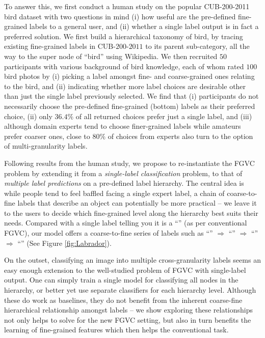 \documentclass[final]{cvpr}
\begin{document}
To answer this, we first conduct a human study on the popular CUB-200-2011 bird dataset \cite{wah2011caltech} with two questions in mind (i) how useful are the pre-defined fine-grained labels to a general user, and (ii) whether a single label output is in fact a preferred solution. We first build a hierarchical taxonomy of bird, by tracing existing fine-grained labels in CUB-$200$-$2011$ to its parent sub-category, all the way to the super node of ``bird'' using Wikipedia.  We then recruited $50$ participants with various background of bird knowledge, each of whom rated $100$ bird photos by (i) picking a label amongst fine- and coarse-grained ones relating to the bird, and (ii) indicating whether more label choices are desirable other than just the single label previously selected. We find that (i) participants do not necessarily choose the pre-defined fine-grained (bottom) labels as their preferred choice, (ii) only $36.4\%$ of all returned choices prefer just a single label, and (iii) although domain experts tend to choose finer-grained labels while amateurs prefer coarser ones, close to $80\%$ of choices from experts also turn to the option of multi-granularity labels.

Following results from the human study, we propose to re-instantiate the FGVC problem by extending it from a \textit{single-label classification} problem, to that of \textit{multiple label predictions} on a pre-defined label hierarchy. The central idea is while people tend to feel baffled facing a single expert label, a chain of coarse-to-fine labels that describe an object can potentially be more practical -- we leave it to the users to decide which fine-grained level along the hierarchy best suits their needs. Compared with a single label telling you it is a ``'' (as per conventional FGVC), our model offers a coarse-to-fine series of labels such as 
``'' 
$\Rightarrow$ 
``'' 
$\Rightarrow$ 
``''
$\Rightarrow$
``'' (See Figure \ref{fig:Labrador}).



On the outset, classifying an image into multiple cross-granularity labels seems an easy enough extension to the well-studied problem of FGVC with single-label output. One can simply train a single model for classifying all nodes in the hierarchy, or better yet use separate classifiers for each hierarchy level. Although these do work as baselines, they do not benefit from the inherent coarse-fine hierarchical relationship amongst labels -- we show exploring these relationships not only helps to solve for the new FGVC setting, but also in turn benefits the learning of fine-grained features which then helps the conventional task.
\end{document}
